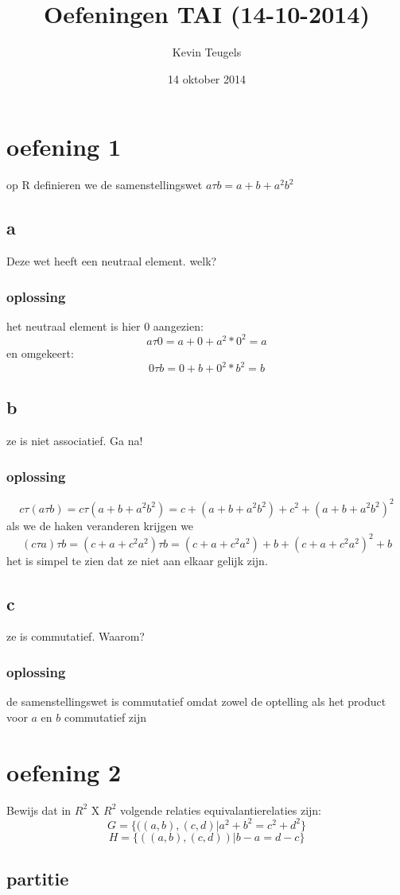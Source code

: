 \documentclass[12pt,a4paper]{article}
\author{Kevin Teugels}
\title{Oefeningen TAI (14-10-2014)}
\date{14 oktober 2014}
\begin{document}
\maketitle
\section{oefening 1}
op R definieren we de samenstellingswet
 $a \tau b= a+b+a^2b^2$
\subsection*{a}
Deze wet heeft een neutraal element. welk?
\subsubsection*{oplossing}
het neutraal element is hier $0$ aangezien:
\[
a\tau 0=a+0+a^2*0^2=a
\]
en omgekeert:
\[
0 \tau b=0+b+0^2*b^2=b
\]

\subsection*{b}
ze is niet associatief. Ga na!
\subsubsection*{oplossing}
\[
c \tau (a \tau b) = c \tau (a+b+a^2b^2)= c+ (a+b+a^2b^2)+c^2+(a+b+a^2b^2)^2
\]
als we de haken veranderen krijgen we
\[
(c \tau a) \tau b= (c+a+c^2a^2) \tau b= (c+a+c^2a^2)+b+(c+a+c^2a^2)^2+b
\]
het is simpel te zien dat ze niet aan elkaar gelijk zijn.

\subsection*{c}
ze is commutatief. Waarom?
\subsubsection*{oplossing}
de samenstellingswet is commutatief omdat zowel de optelling als het product voor $a$ en $b$ commutatief zijn
\section{oefening 2}
Bewijs dat in $R^2$ X $R^2$ volgende relaties equivalantierelaties zijn:
\[
G= \{((a,b),(c,d)|a^2+b^2=c^2+d^2\}
\]
\[
H=\{((a,b),(c,d))|b-a=d-c\}
\]
\subsection*{partitie}
\end{document}

